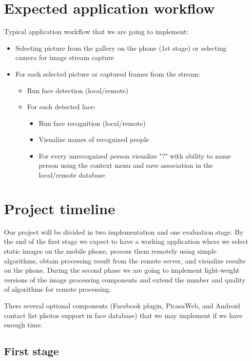 \documentclass[onecolumn,conference]{IEEEtran}
\begin{document}
\section{Expected application workflow}

Typical application workflow that we are going to implement:

\begin{itemize}
	\item Selecting picture from the gallery on the phone (1st stage) or selecting camera for image stream capture
	\item For each selected picture or captured frames from the stream:
	\begin{itemize}
		\item Run face detection (local/remote)
		\item For each detected face:
		\begin{itemize}
			\item Run face recognition (local/remote)
			\item Visualize names of recognized people
			\item For every unrecognized person visualize "?" with ability to name person using the context menu and save association in the local/remote database
		\end{itemize}
	\end{itemize}
\end{itemize}

\section{Project timeline}

Our project will be divided in two implementation and one evaluation stage. By the end of the first stage we expect to have a working application where we select static images on the mobile phone, process them remotely using simple algorithms, obtain processing result from the remote server, and visualize results on the phone. During the second phase we are going to implement light-weight versions of the image processing components and extend the number and quality of algorithms for remote processing.

There several optional components (Facebook plugin, PicasaWeb, and Android contact list photos support in face database) that we may implement if we have enough time.

\subsection{First stage}
\end{document}
